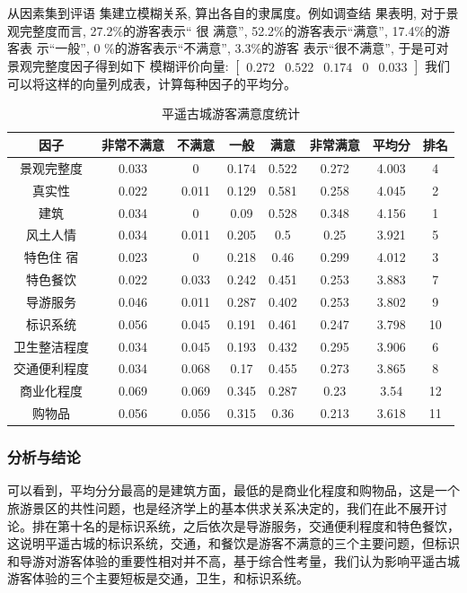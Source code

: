 \documentclass[UTF8]{ctexart}
\begin{document}
从因素集到评语 集建立模糊关系, 算出各自的隶属度。例如调查结 果表明, 对于景观完整度而言, 27.2\%的游客表示“ 很 满意”, 52.2\%的游客表示“满意”, 17.4\%的游客表 示“一般”, 0 \%的游客表示“不满意”, 3.3\%的游客 表示“很不满意”, 于是可对景观完整度因子得到如下 模糊评价向量:
$\begin{bmatrix}
0.272&0.522&0.174&0&0.033
\end{bmatrix}$
我们可以将这样的向量列成表，计算每种因子的平均分。
\begin{table}[H]
\centering
\caption{平遥古城游客满意度统计}
\begin{tabular}{cccccccc}
    \toprule
    因子&非常不满意&不满意&一般&满意&非常满意&平均分&排名\\
    \midrule
    景观完整度&0.033&0	&0.174&0.522	&0.272&4.003  &4\\
    真实性&0.022	&0.011	&0.129&	0.581	&0.258&4.045&2\\
    建筑&0.034	&0	&0.09	&0.528& 0.348&4.156&1\\
    风土人情&0.034	&0.011	&0.205	&0.5	&0.25&3.921&5\\
    特色住 宿&0.023	&0&	0.218&	0.46&	0.299&4.012&3\\
    特色餐饮&0.022	&0.033&	0.242	&0.451	&0.253&3.883&7\\
    导游服务&0.046	&0.011	&0.287&0.402	&0.253&3.802&9\\
    标识系统&0.056	&0.045	&0.191	&0.461	&0.247&3.798&10\\
    卫生整洁程度&0.034	&0.045	&0.193	&0.432	&0.295&3.906&6\\
    交通便利程度&0.034	&0.068	&0.17	&0.455&	0.273&3.865&8\\
    商业化程度&0.069&0.069&0.345&0.287&0.23&3.54&12\\
    购物品&0.056&	0.056	&0.315	&0.36	&0.213&3.618&11\\
    \bottomrule
\end{tabular}
\end{table}
\subsubsection{分析与结论}
可以看到，平均分分最高的是建筑方面，最低的是商业化程度和购物品，这是一个旅游景区的共性问题，也是经济学上的基本供求关系决定的，我们在此不展开讨论。排在第十名的是标识系统，之后依次是导游服务，交通便利程度和特色餐饮，这说明平遥古城的标识系统，交通，和餐饮是游客不满意的三个主要问题，但标识和导游对游客体验的重要性相对并不高，基于综合性考量，我们认为影响平遥古城游客体验的三个主要短板是交通，卫生，和标识系统。
\end{document}
